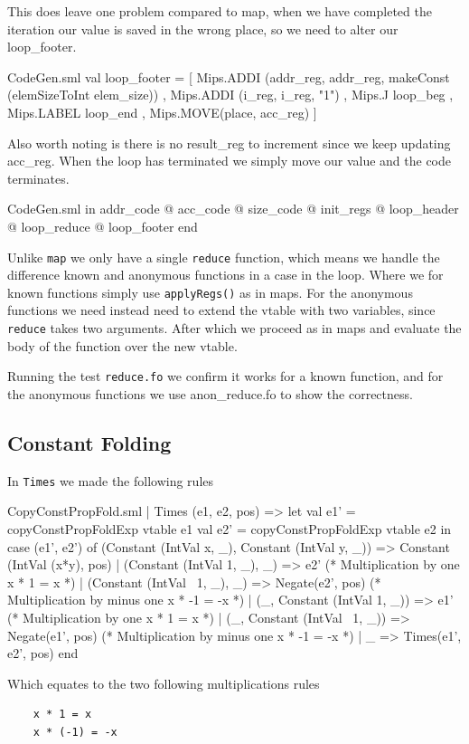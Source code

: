 \documentclass[11pt,a4paper,oneside]{report}
\begin{document}
This does leave one problem compared to map, when we have completed the iteration our value is saved in the wrong place, so we need to alter our loop\_footer.
\begin{code}[firstnumber=672]{CodeGen.sml}
val loop_footer =
  [ Mips.ADDI (addr_reg, addr_reg, makeConst (elemSizeToInt elem_size))
  , Mips.ADDI (i_reg, i_reg, "1")
  , Mips.J loop_beg
  , Mips.LABEL loop_end
  , Mips.MOVE(place, acc_reg)
  ]
\end{code}
Also worth noting is there is no result\_reg to increment since we keep updating acc\_reg. When the loop has terminated we simply move our value and the code terminates.
\begin{code}[firstnumber=678]{CodeGen.sml}
        in addr_code
          @ acc_code
          @ size_code
          @ init_regs
          @ loop_header
          @ loop_reduce
          @ loop_footer
        end
\end{code}

Unlike \texttt{map} we only have a single \texttt{reduce} function, which means we handle the difference known and anonymous functions in a case in the loop. Where we for known functions simply use \texttt{applyRegs()} as in maps. For the anonymous functions we need instead need to extend the vtable with two variables, since \texttt{reduce} takes two arguments. After which we proceed as in maps and evaluate the body of the function over the new vtable.

Running the test \texttt{reduce.fo} we confirm it works for a known function, and for the anonymous functions we use anon\_reduce.fo to show the correctness.

\newpage
\subsection*{Constant Folding}
In \texttt{Times} we made the following rules
\begin{code}[firstnumber=43]{CopyConstPropFold.sml}
      | Times (e1, e2, pos) =>
        let val e1' = copyConstPropFoldExp vtable e1
            val e2' = copyConstPropFoldExp vtable e2
        in case (e1', e2') of
          (Constant (IntVal x, _),
          Constant (IntVal y, _)) =>
          Constant (IntVal (x*y), pos)
          | (Constant                 (IntVal 1, _), _)   =>
            e2' (* Multiplication by one x * 1 = x *)
          | (Constant (IntVal ~1, _), _)   =>
            Negate(e2', pos)
            (* Multiplication by minus one x * -1 = -x *)
          | (_, Constant (IntVal 1, _))   =>
            e1'
            (* Multiplication by one x * 1 = x *)
          | (_, Constant (IntVal ~1, _))   =>
            Negate(e1', pos)
            (* Multiplication by minus one x * -1 = -x *)
          | _                             =>
            Times(e1', e2', pos)
        end
\end{code}
Which equates to the two following multiplications rules
\begin{center}
  \begin{verbatim}
    x * 1 = x
    x * (-1) = -x
    \end{verbatim}
\end{center}
\end{document}
